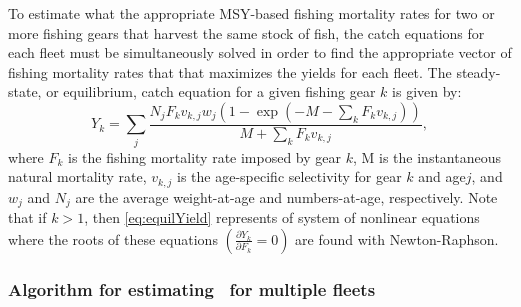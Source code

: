 To estimate what the appropriate MSY-based fishing mortality rates for two or more fishing gears that harvest the same stock of fish, the catch equations for each fleet must be simultaneously solved in order to find the appropriate vector of fishing mortality rates that that maximizes the yields for each fleet.  The steady-state, or equilibrium, catch equation for a given fishing gear $k$ is given by:
\begin{equation}\label{eq:equilYield}
	 Y_{k} = \sum_j\frac{N_j F_k v_{k,j} w_j (1-\exp(-M-\sum_k F_k v_{k,j}))} {M + \sum_k F_k v_{k,j}},
\end{equation}
where $F_k$ is the fishing mortality rate imposed by gear $k$, M is the instantaneous natural mortality rate, $v_{k,j}$ is the age-specific selectivity for gear $k$ and age$j$, and $w_j$ and $N_j$ are the average weight-at-age and numbers-at-age, respectively.  Note that if $k>1$, then \eqref{eq:equilYield} represents of system of nonlinear equations where the roots of these equations $\left(\frac{\partial Y_k}{\partial F_k}=0\right)$ are found with Newton-Raphson.

\subsubsection{Algorithm for estimating \fmsy\ for multiple fleets} %
\label{ssub:algorithm_for_estimating_fmsy_for_multiple_fleets}




